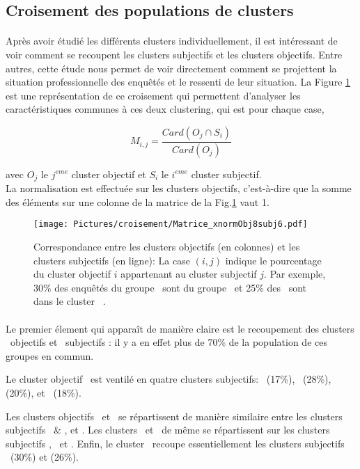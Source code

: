 \documentclass[11pt,fleqn,openany,frenchb]{book} %
\begin{document}
\subsection{Croisement des populations de clusters}
\paragraph{}
Après avoir étudié les différents clusters individuellement, il est intéressant de voir comment se recoupent les clusters subjectifs et les clusters objectifs. Entre autres, cette étude nous permet de voir directement comment se projettent la situation professionnelle des enquêtés et le ressenti de leur situation. La Figure \ref{fig:objxsubj} est une représentation de ce croisement qui permettent d'analyser les caractéristiques communes à ces deux clustering, qui est pour chaque case, 

$$M_{i,j} = \frac{Card(O_j \cap S_i)}{Card(O_j)}$$

avec $O_j$ le $j^{eme}$ cluster objectif et $S_i$ le $i^{eme}$ cluster subjectif. \\

La normalisation est effectuée sur les clusters objectifs, c'est-à-dire que la somme des éléments sur une colonne de la matrice de la Fig.\ref{fig:objxsubj} vaut 1.

\begin{figure}[!h]
\center
\texttt{[image: Pictures/croisement/Matrice\_xnormObj8subj6.pdf]}
\caption{Correspondance entre les clusters objectifs (en colonnes) et les clusters subjectifs (en ligne): La case $(i,j)$ indique le pourcentage du cluster objectif $i$ appartenant au cluster subjectif $j$. Par exemple, 30\% des enquêtés du groupe \ACC\ sont du groupe \MALH\, et 25\% des \ACC\ sont dans le cluster \ENV\ .}
\label{fig:objxsubj}
\end{figure} %
\paragraph{}
Le premier élement qui apparaît de manière claire est le recoupement des clusters \INDEP\ objectifs et \INDEP\ subjectifs : il y a en effet plus de 70\% de la population de ces groupes en commun. 

Le cluster objectif \SERV\ est ventilé en quatre clusters subjectifs: \INDEP\ (17\%), \HEUR\ (28\%), \RAS (20\%), et \ENV\ (18\%). 

Les clusters objectifs \OUVR\ et \IMM\ se répartissent de manière similaire entre les clusters subjectifs \HEUR\ \& \RAS, et \ENV. Les clusters \CSPPPr\ et \CSPPPu\ de même se  répartissent sur les clusters subjectifs \RAS, \GLOB\ et \ENV. Enfin, le cluster \ACC\  recoupe 
essentiellement les clusters subjectifs \MALH\ (30\%) et \ENV (26\%).
\end{document}
